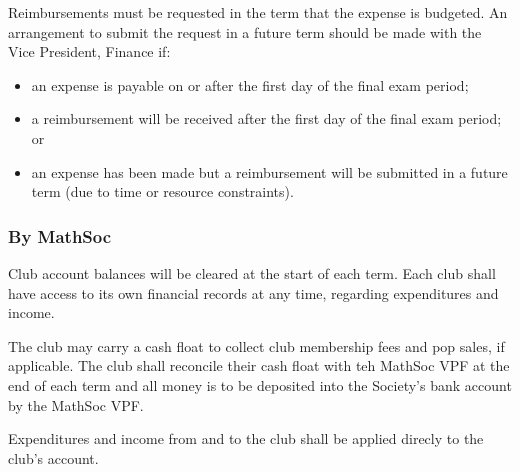 Reimbursements must be requested in the term that the expense is budgeted. 
An arrangement to submit the request in a future term should be made with
the Vice President, Finance if:
\begin{itemize}
	\item an expense is payable on or after the first day of the final exam period;
	\item a reimbursement will be received after the first day of the final exam period; or
	\item an expense has been made but a reimbursement will be submitted in a 
	future term (due to time or resource constraints).
\end{itemize}

\subsubsection{By MathSoc} 
Club account balances will be cleared at the start of each term. Each club shall have access to its own financial records at any time, regarding expenditures and income. 

The club may carry a cash float to collect club membership fees and pop sales, if applicable. 
The club shall reconcile their cash float with teh MathSoc VPF at the end of each term and all money is to be deposited into the Society's bank account by the MathSoc VPF. 

Expenditures and income from and to the club shall be applied direcly to the club's account. 
